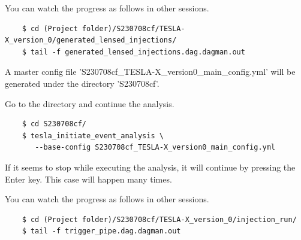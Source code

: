 You can watch the progress as follows in other sessions.

\begin{verbatim}
    $ cd (Project folder)/S230708cf/TESLA-X_version_0/generated_lensed_injections/
    $ tail -f generated_lensed_injections.dag.dagman.out
\end{verbatim}

A master config file 'S230708cf\_TESLA-X\_version0\_main\_config.yml' will be generated under the directory 'S230708cf'.

Go to the directory and continue the analysis.

\begin{verbatim}
    $ cd S230708cf/
    $ tesla_initiate_event_analysis \
       --base-config S230708cf_TESLA-X_version0_main_config.yml
\end{verbatim}

If it seems to stop while executing the analysis, it will continue by pressing the Enter key. This case will happen many times.

You can watch the progress as follows in other sessions.

\begin{verbatim}
    $ cd (Project folder)/S230708cf/TESLA-X_version_0/injection_run/
    $ tail -f trigger_pipe.dag.dagman.out
\end{verbatim}
